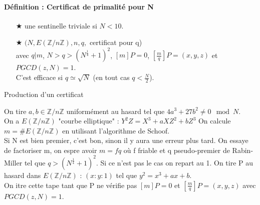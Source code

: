 \documentclass[12pt,a4paper]{report}
\begin{document}
\paragraph{Définition : Certificat de primalité pour N\\}
\begin{itemize}
\item[$\bigstar$] une sentinelle triviale si $N<10$.
\item[$\bigstar$] $(N,E(\mathbb{Z}/n\mathbb{Z}),n,q,$ certificat pour q)\\
avec $q|m$, $N>q>\left(N^{\frac{1}{4}}+1\right)^2$, $[m]P=0$, $\left[\frac{m}{q}\right] P = (x,y,z)$ et $PGCD(z,N) = 1$.\\
C'est efficace si $q \simeq\sqrt{N}$ (en tout cas $ q < \frac{N}{2}$).
\end{itemize}
\begin{algorithm}[ht]
\caption{Production d'un certificat}
\begin{algorithmic}[1]
\STATE On tire $a,b \in \mathbb{Z}/n \mathbb{Z}$ uniformément au hasard tel que $4a^3+27b^2 \neq 0 \mod N$.\\
On a $E( \mathbb{Z}/n \mathbb{Z})$ "courbe elliptique" : $ Y^2Z = X^3 + aXZ^2+bZ^3$
\STATE On calcule $m = \# E( \mathbb{Z}/n \mathbb{Z})$ en utilisant l'algorithme de Schoof.\\
Si N est bien premier, c'est bon, sinon il y aura une erreur plus tard.
\STATE On essaye de factoriser m, on espre avoir $m=fq$ où f friable et q pseudo-premier de Rabin-Miller tel que $q>\left(N^{\frac{1}{4}}+1\right)^2$. Si ce n'est pas le cas on repart au 1.
\STATE On tire P au hasard dans $E(\mathbb{Z}/n\mathbb{Z})$ : $(x:y:1)$ tel  que $y^2=x^3+ax+b$. \\
On itre cette tape tant que P ne vérifie pas $[m]P=0$ et $\left[\frac{m}{q}\right] P = (x,y,z)$ avec $PGCD(z,N) = 1$.
\end{algorithmic}
\end{algorithm}
\end{document}
